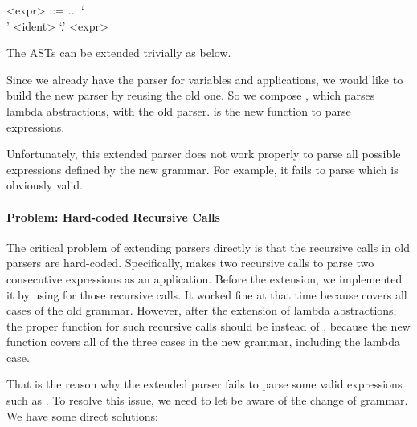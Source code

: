 \setlength{\grammarindent}{5em}
\begin{grammar}
<expr> ::= ...
    \alt `\\' <ident> `.' <expr>
\end{grammar}

The ASTs can be extended trivially as below.


Since we already have the parser for variables and applications, we would like to build the new parser by reusing the old one. So we compose , which parses lambda abstractions, with the old parser.  is the new function to parse expressions.


Unfortunately, this extended parser does not work properly to parse all possible expressions defined by the new grammar. For example, it fails to parse   which is obviously valid.

\paragraph{Problem: Hard-coded Recursive Calls} The critical problem of extending parsers directly is that the recursive calls in old parsers are hard-coded. Specifically,  makes two recursive calls to parse two consecutive expressions as an application. Before the extension, we implemented it by using  for those recursive calls. It worked fine at that time because  covers all cases of the old grammar. However, after the extension of lambda abstractions, the proper function for such recursive calls should be  instead of , because the new function  covers all of the three cases in the new grammar, including the lambda case.

That is the reason why the extended parser fails to parse some valid expressions such as  . To resolve this issue, we need to let  be aware of the change of grammar. We have some direct solutions:

